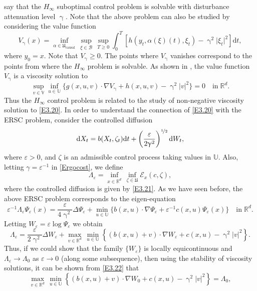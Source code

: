 \documentclass[notitlepage,11pt,reqno]{amsart}
\numberwithin{equation}{section}
\theoremstyle{plain}
\theoremstyle{definition}
\theoremstyle{remark}
\newcommand{\Act}{{\mathds{U}}}
\newcommand{\cB}{{\mathcal{B}}}     %
\newcommand{\sE}{{\mathscr{E}}}     %
\newcommand{\Uadm}{\mathfrak{U}}
\newcommand{\Uc}{\mathfrak{U}_{\mathrm{causal}}}
\newcommand{\Rd}{{\mathds{R}^{d}}}
\newcommand{\D}{\mathrm{d}} %
\newcommand{\abs}[1]{\lvert#1\rvert}
\newcommand{\grad}{\nabla}
\begin{document}
say that the $H_\infty$ suboptimal control problem is solvable with disturbance attenuation level $\upgamma$. Note that the above problem  can also be 
studied by considering the value function
$$V_\upgamma(x)=\inf_{\alpha\in\Uc}\, \sup_{\xi\in\cB}\, \sup_{T\geq 0} \int_0^T [h(y_t, \alpha(\xi)(t), \xi_t)-\upgamma^2 \abs{\xi_t}^2 ]\D{t},$$
where $y_0=x$. Note that $V_\upgamma\geq 0$.
The points where $V_\upgamma$ vanishes correspond to the points from where the $H_\infty$ problem is solvable. As shown in \cite{MR1384966}, 
the value function $V_\upgamma$
is a viscosity solution to 
\begin{equation}\label{E3.20}
\sup_{v\in\mathbb{V}}\inf_{u\in\Act}\{g(x, u, v)\cdot \grad V_\upgamma + h(x, u, v)-\upgamma^2 |v|^2 \}=0\quad \text{in}\; \Rd.
\end{equation}
Thus the $H_\infty$ control problem is related to the study of non-negative viscosity solution to \eqref{E3.20}.
In order to understand the connection of \eqref{E3.20} with the ERSC problem, consider the controlled diffusion
\begin{equation}\label{E3.21}
\D{X}_t = b(X_t, \zeta_t)\D{t} + \left(\frac{\varepsilon}{2\upgamma^2}\right)^{\nicefrac{1}{2}}\D{W}_t,
\end{equation}
where $\varepsilon>0$, and $\zeta$ is an admissible control process taking values in $\Act$. Also, letting $\gamma=\varepsilon^{-1}$ in \eqref{Ergocost}, we define
$$\Lambda_\varepsilon= \inf_{x\in\Rd}\,\inf_{\zeta\in\Uadm} \sE_x(c, \zeta),$$
where the controlled diffusion is given by \eqref{E3.21}. As we have seen before, the above ERSC problem corresponds to the 
eigen-equation
$$\varepsilon^{-1} \Lambda_\varepsilon\Psi_\varepsilon(x)= \frac{\varepsilon}{4\upgamma^2}\Delta\Psi_\varepsilon + \min_{u\in\Act}\{b(x, u)\cdot\grad\Psi_\varepsilon + \varepsilon^{-1} c(x, u)\Psi_\varepsilon(x)\}\quad \text{in}\; \Rd.$$
Letting $W_\varepsilon=\varepsilon\log\Psi_\varepsilon$ we obtain
\begin{equation}\label{E3.22}
\Lambda_\varepsilon = \frac{\varepsilon}{2\upgamma^2}\Delta W_\varepsilon + \max_{v\in\Rd}\,\min_{u\in\Act}\left\{(b(x, u)+v)\cdot \grad W_\varepsilon + c(x, u) -\upgamma^2 \abs{v}^2\right\}.
\end{equation}
Thus, if we could show that the family $\{W_\varepsilon\}$ is locally equicontinuous and $\Lambda_\varepsilon\to \Lambda_0$ as $\varepsilon\to 0$ (along some subsequence), then using the stability
of viscosity solutions, it can be shown from \eqref{E3.22} that
\begin{equation}\label{E3.23}
\max_{v\in\Rd}\,\min_{u\in\Act}\left\{(b(x, u)+v)\cdot \grad W_0 + c(x, u) -\upgamma^2 \abs{v}^2\right\}=\Lambda_0,
\end{equation}
\end{document}
